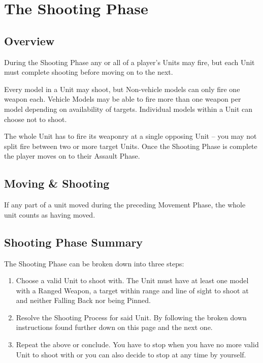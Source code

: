 
\chapter{The Shooting Phase}

\section{Overview}

During the Shooting Phase any or all of a player's Units may
fire, but each Unit must complete shooting before moving on
to the next.

Every model in a Unit may shoot, but Non-vehicle models can
only fire one weapon each. Vehicle Models may be able to fire
more than one weapon per model depending on availability of
targets. Individual models within a Unit can choose not to
shoot.

The whole Unit has to fire its weaponry at a single opposing
Unit – you may not split fire between two or more target Units.
Once the Shooting Phase is complete the player moves on to
their Assault Phase.

\section{Moving \& Shooting}
If any part of a unit moved during the preceding Movement
Phase, the whole unit counts as having moved.


\section{Shooting Phase Summary}

The Shooting Phase can be broken down into three steps:

\begin{enumerate}
	\item Choose a valid Unit to shoot with.
The Unit must have at least one model with a Ranged
Weapon, a target within range and line of sight to shoot at and
neither Falling Back nor being Pinned.

\item Resolve the Shooting Process for said Unit.
By following the broken down instructions found further down
on this page and the next one.

\item Repeat the above or conclude.
You have to stop when you have no more valid Unit to shoot
with or you can also decide to stop at any time by yourself.

\end{enumerate}

